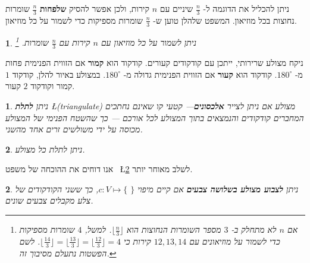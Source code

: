 \documentclass[12pt,a4paper]{article}
\newtheorem{theorem}{\R{משפט}}
\newtheorem{definition}{\R{הגדרה}}
\begin{document}
ניתן להכליל את הדוגמה ל-%
$\frac{n}{3}$
שיניים עם
$n$
קירות, ולכן אפשר להסיק 
\textbf{שלפחות}
$\frac{n}{3}$
שומרות נחוצות בכל מוזיאון. המשפט שלהלן טוען ש-%
$\frac{n}{3}$
שומרות מספיקות כדי לשמור על כל מוזיאון.



\begin{theorem}\label{thm.guarded} 
ניתן לשמור על כל מוזיאון עם
$n$
קירות עם 
$\frac{n}{3}$
שומרות.%
\footnote{אם 
$n$
לא מתחלק ב-%
$3$
מספר השומרות הנחוצות הוא 
$\lfloor \frac{n}{3}\rfloor$.
למשל,
$4$
שומרות מספיקות כדי לשמור על מוזיאונים עם
$12, 13, 14$
קירות כי
$\lfloor \frac{14}{3}\rfloor =\lfloor \frac{13}{3}\rfloor=\lfloor \frac{12}{3}\rfloor=4$.
לשם הפשטות נתעלם מסיבוך זה.}
\end{theorem}

ניקח מצולע שרירותי, ייתכן עם קודקודים קעורים. קודקוד הוא 
\textbf{קמור}
אם הזווית הפנימית פחות מ-%
$180^\circ$.
קודקוד הוא
\textbf{קעור}
אם הזווית הפנימית גדולה מ-%
$180^\circ$.
במצולע באיור להלן, קודקוד 
$1$
קמור וקודקוד
$2$
קעור.

\begin{center}
\end{center}

\begin{definition}
ניתן
\textbf{לתלת}
\L{(triangulate)}
מצולע אם ניתן לצייר 
\textbf{אלכסונים}---%
קטעי קו שאינם נחתכים המחברים קודקודים והנמצאים בתוך המצולע לכל אורכם%
---%
כך שהשטח הפנימי של המצולע מכוסה על ידי משולשים זרים אחד מהשני.
\end{definition}


\begin{theorem}\label{thm.tri}
ניתן לתלת כל מצולע.
\end{theorem}

אנו דוחים את ההוכחה של משפט~%
\L{\ref{thm.tri}}
לשלב מאוחר יותר.
\begin{definition}
ניתן
\textbf{לצבוע מצולע בשלושה צבעים}
אם קיים מיפוי
$\}$%
%
$c: V \mapsto \{$,
כך ששני הקודקודים של צלע מקבלים צבעים שונים.
\end{definition}
\end{document}
